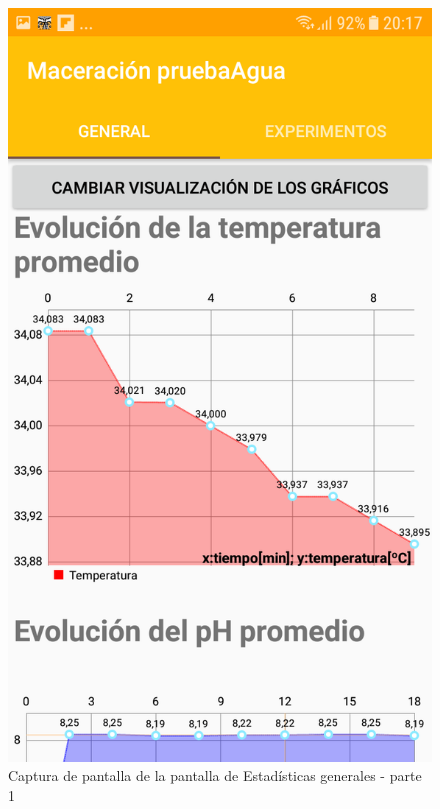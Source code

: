             \begin{figure}[h]
                \centering
                \includegraphics[scale=0.2]{software/ScreenCapture/GeneralStatistics.jpg}
                \caption{Captura de pantalla de la pantalla de Estadísticas generales - parte 1}
                \label{fig:CapturaGeneralFrag-P1}
            \end{figure}
            
